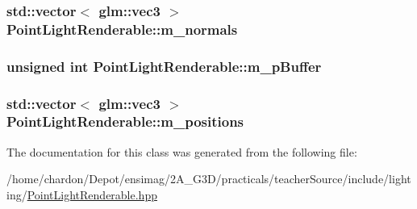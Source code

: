 \hypertarget{classPointLightRenderable_a91714162c3bed982468ba2e506430585}{
\subsubsection[{m\+\_\+normals}]{\setlength{\rightskip}{0pt plus 5cm}std\+::vector$<$ glm\+::vec3 $>$ Point\+Light\+Renderable\+::m\+\_\+normals\hspace{0.3cm}{\ttfamily [private]}}}\label{classPointLightRenderable_a91714162c3bed982468ba2e506430585}
\hypertarget{classPointLightRenderable_a013e5165f655d3a43144a4a16bcec001}{
\subsubsection[{m\+\_\+p\+Buffer}]{\setlength{\rightskip}{0pt plus 5cm}unsigned int Point\+Light\+Renderable\+::m\+\_\+p\+Buffer\hspace{0.3cm}{\ttfamily [private]}}}\label{classPointLightRenderable_a013e5165f655d3a43144a4a16bcec001}
\hypertarget{classPointLightRenderable_ae63fb46f04473b2c25c46e61744922aa}{
\subsubsection[{m\+\_\+positions}]{\setlength{\rightskip}{0pt plus 5cm}std\+::vector$<$ glm\+::vec3 $>$ Point\+Light\+Renderable\+::m\+\_\+positions\hspace{0.3cm}{\ttfamily [private]}}}\label{classPointLightRenderable_ae63fb46f04473b2c25c46e61744922aa}


The documentation for this class was generated from the following file\+:\begin{DoxyCompactItemize}
\item 
/home/chardon/\+Depot/ensimag/2\+A\+\_\+\+G3\+D/practicals/teacher\+Source/include/lighting/\hyperlink{PointLightRenderable_8hpp}{Point\+Light\+Renderable.\+hpp}\end{DoxyCompactItemize}
